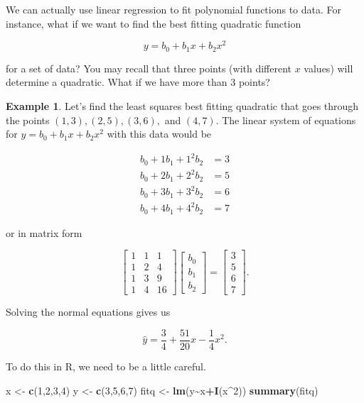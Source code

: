 \documentclass[
]{book}
\newenvironment{Shaded}{\begin{snugshade}}{\end{snugshade}}
\newcommand{\DecValTok}[1]{\textcolor[rgb]{0.00,0.00,0.81}{#1}}
\newcommand{\FunctionTok}[1]{\textcolor[rgb]{0.13,0.29,0.53}{\textbf{#1}}}
\newcommand{\NormalTok}[1]{#1}
\newcommand{\OtherTok}[1]{\textcolor[rgb]{0.56,0.35,0.01}{#1}}
\newcommand{\SpecialCharTok}[1]{\textcolor[rgb]{0.81,0.36,0.00}{\textbf{#1}}}
\theoremstyle{definition}
\theoremstyle{definition}
\newtheorem{example}{Example}[chapter]
\theoremstyle{definition}
\theoremstyle{definition}
\theoremstyle{remark}
\begin{document}
We can actually use linear regression to fit polynomial functions to data. For instance, what if we want to find the best fitting quadratic function

\[y=b_0+b_1x+b_2x^2\]

for a set of data? You may recall that three points (with different \(x\) values) will determine a quadratic. What if we have more than 3 points?

\begin{examplebox}

\begin{example}
Let's find the least squares best fitting quadratic that goes through the points \((1,3),(2,5),(3,6),\) and \((4,7)\).
The linear system of equations for \(y=b_0+b_1x+b_2x^2\) with this data would be

\begin{align*} 
    b_0+1b_1+1^2b_2&=3\\
    b_0+2b_1+2^2b_2&=5\\
    b_0+3b_1+3^2b_2&=6\\
    b_0+4b_1+4^2b_2&=7
\end{align*}

or in matrix form

\[\begin{bmatrix}1 & 1 & 1 \\ 1 & 2 & 4\\1 & 3 & 9\\1 & 4 & 16\end{bmatrix}\begin{bmatrix}b_0\\b_1\\b_2\end{bmatrix}=\begin{bmatrix}3\\5\\6\\7\end{bmatrix}.\]

Solving the normal equations gives us

\[\hat{y}=\frac{3}{4}+\frac{51}{20}x-\frac{1}{4}x^2.\]

To do this in R, we need to be a little careful.

\begin{Shaded}
\begin{Highlighting}[]
\NormalTok{x }\OtherTok{\textless{}{-}} \FunctionTok{c}\NormalTok{(}\DecValTok{1}\NormalTok{,}\DecValTok{2}\NormalTok{,}\DecValTok{3}\NormalTok{,}\DecValTok{4}\NormalTok{)}
\NormalTok{y }\OtherTok{\textless{}{-}} \FunctionTok{c}\NormalTok{(}\DecValTok{3}\NormalTok{,}\DecValTok{5}\NormalTok{,}\DecValTok{6}\NormalTok{,}\DecValTok{7}\NormalTok{)}
\NormalTok{fitq }\OtherTok{\textless{}{-}} \FunctionTok{lm}\NormalTok{(y}\SpecialCharTok{\textasciitilde{}}\NormalTok{x}\SpecialCharTok{+}\FunctionTok{I}\NormalTok{(x}\SpecialCharTok{\^{}}\DecValTok{2}\NormalTok{))}
\FunctionTok{summary}\NormalTok{(fitq)}
\end{Highlighting}
\end{Shaded}


\end{example}
\end{examplebox}
\end{document}

